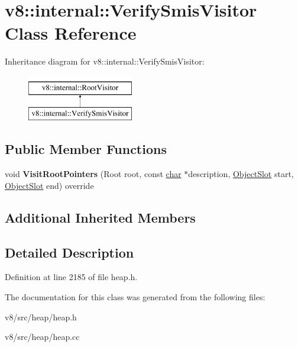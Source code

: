 \hypertarget{classv8_1_1internal_1_1VerifySmisVisitor}{}\section{v8\+:\+:internal\+:\+:Verify\+Smis\+Visitor Class Reference}
\label{classv8_1_1internal_1_1VerifySmisVisitor}
Inheritance diagram for v8\+:\+:internal\+:\+:Verify\+Smis\+Visitor\+:\begin{figure}[H]
\begin{center}
\leavevmode
\includegraphics[height=2.000000cm]{classv8_1_1internal_1_1VerifySmisVisitor}
\end{center}
\end{figure}
\subsection*{Public Member Functions}
\begin{DoxyCompactItemize}
\item 
\mbox{\label{classv8_1_1internal_1_1VerifySmisVisitor_a02e1d1419fa9d90ad25fc86fd5cffa72}} 
void {\bfseries Visit\+Root\+Pointers} (Root root, const \mbox{\hyperlink{classchar}{char}} $\ast$description, \mbox{\hyperlink{classv8_1_1internal_1_1ObjectSlot}{Object\+Slot}} start, \mbox{\hyperlink{classv8_1_1internal_1_1ObjectSlot}{Object\+Slot}} end) override
\end{DoxyCompactItemize}
\subsection*{Additional Inherited Members}


\subsection{Detailed Description}


Definition at line 2185 of file heap.\+h.



The documentation for this class was generated from the following files\+:\begin{DoxyCompactItemize}
\item 
v8/src/heap/heap.\+h\item 
v8/src/heap/heap.\+cc\end{DoxyCompactItemize}
